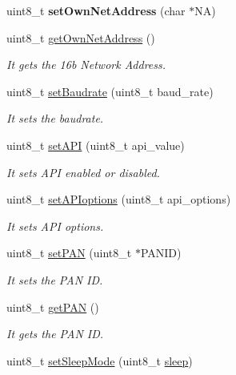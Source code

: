 \begin{DoxyCompactItemize}
\item 
uint8\+\_\+t {\bfseries set\+Own\+Net\+Address} (char $\ast$NA)\hypertarget{class_wasp_x_bee_core_a5d2effb3603c2ea8ee5f47b31c72976c}{}\label{class_wasp_x_bee_core_a5d2effb3603c2ea8ee5f47b31c72976c}

\item 
uint8\+\_\+t \hyperlink{class_wasp_x_bee_core_a084d15de2d68b922be86c8fbf76c14e5}{get\+Own\+Net\+Address} ()
\begin{DoxyCompactList}\small\item\em It gets the 16b Network Address. \end{DoxyCompactList}\item 
uint8\+\_\+t \hyperlink{class_wasp_x_bee_core_a5021f2cfc68506a42777f6f642ee9a24}{set\+Baudrate} (uint8\+\_\+t baud\+\_\+rate)
\begin{DoxyCompactList}\small\item\em It sets the baudrate. \end{DoxyCompactList}\item 
uint8\+\_\+t \hyperlink{class_wasp_x_bee_core_ab0d5559201e258a1fec20a350aed6d26}{set\+A\+PI} (uint8\+\_\+t api\+\_\+value)
\begin{DoxyCompactList}\small\item\em It sets A\+PI enabled or disabled. \end{DoxyCompactList}\item 
uint8\+\_\+t \hyperlink{class_wasp_x_bee_core_a70659c0e16db67153810a514f52d2842}{set\+A\+P\+Ioptions} (uint8\+\_\+t api\+\_\+options)
\begin{DoxyCompactList}\small\item\em It sets A\+PI options. \end{DoxyCompactList}\item 
uint8\+\_\+t \hyperlink{class_wasp_x_bee_core_ab9e170bd1a07f49ee1de5215109a61ff}{set\+P\+AN} (uint8\+\_\+t $\ast$P\+A\+N\+ID)
\begin{DoxyCompactList}\small\item\em It sets the P\+AN ID. \end{DoxyCompactList}\item 
uint8\+\_\+t \hyperlink{class_wasp_x_bee_core_ada9bf5aa93a54ce150971d73444c5c27}{get\+P\+AN} ()
\begin{DoxyCompactList}\small\item\em It gets the P\+AN ID. \end{DoxyCompactList}\item 
uint8\+\_\+t \hyperlink{class_wasp_x_bee_core_a7c4465619df8a22ca6a6092546f93537}{set\+Sleep\+Mode} (uint8\+\_\+t \hyperlink{class_wasp_x_bee_core_a15dbaf3f5f69b1400a4b39b2136c6536}{sleep})

\end{DoxyCompactItemize}
